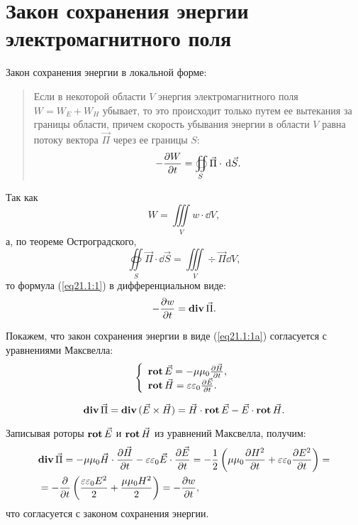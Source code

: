\section{Закон сохранения энергии электромагнитного поля}

	Закон сохранения энергии в локальной форме:
	\begin{quote}
        Если в некоторой области \( V \) энергия электромагнитного поля
        \( W = W_{E} + W_{H} \) убывает, то это происходит только путем ее
        вытекания за границы области, причем скорость убывания энергии в области
        \( V \) равна потоку вектора \( \vec{\Pi} \) через ее границы \( S \):
        \begin{equation}
            -\frac{\partial W}{\partial t} = \oiint\limits_S \vec{\Pi}\cdot\,\mathrm{d}\vec{S}.
            \label{eq21.1:1}
        \end{equation}
	\end{quote}
	
	Так как
    \[
        W = \iiint\limits_V w\cdot\dd V,
    \]
    а, по теореме Остроградского,
    \[
        \oiint\limits_S \vec{\Pi}\cdot\dd\vec{S} =
        \iiint\limits_V \div\vec{\Pi}\dd V,
    \]
    то формула (\ref{eq21.1:1}) в дифференциальном виде:
	\begin{equation}
		-\frac{\partial w}{\partial t} = \mathbf{div\,}\vec{\Pi}.
        \label{eq21.1:1a}
	\end{equation}
	
	Покажем, что закон сохранения энергии в виде (\ref{eq21.1:1a}) согласуется
    с уравнениями Максвелла:
	\[
        \left\{
        \begin{array}{l}
            \mathbf{rot\,}\vec{E} = -\mu\mu_0\frac{\partial \vec{H}}{\partial t}, \\
            \mathbf{rot\,}\vec{H} = \varepsilon\varepsilon_0\frac{\partial \vec{E}}{\partial t}.
        \end{array}
        \right.
    \]
	
	\[
        \mathbf{div\,}\vec{\Pi} = \mathbf{div\,}(\vec{E}\times\vec{H}) = \vec{H}\cdot\mathbf{rot\,}\vec{E} -
        \vec{E}\cdot\mathbf{rot\,}\vec{H}.
    \]
	
	Записывая роторы \( \mathbf{rot\,}\vec{E} \) и \( \mathbf{rot\,}\vec{H} \) из уравнений
    Максвелла, получим:
    \begin{align*}
        & \mathbf{div\,}\vec{\Pi} = -\mu\mu_0\vec{H}\cdot\frac{\partial \vec{H}}{\partial t} -
            \varepsilon\varepsilon_0\vec{E}\cdot\frac{\partial \vec{E}}{\partial t} =
            -\frac{1}{2} \left(\mu\mu_0\frac{\partial H^2}{\partial t} +
            \varepsilon\varepsilon_0\frac{\partial E^2}{\partial t}\right) = \\
        & = -\frac{\partial }{\partial t} \left(\frac{\varepsilon\varepsilon_0 E^2}{2}
            + \frac{\mu\mu_0 H^2}{2}\right) = -\frac{\partial w}{\partial t},
    \end{align*}
	что согласуется с законом сохранения энергии.
	
